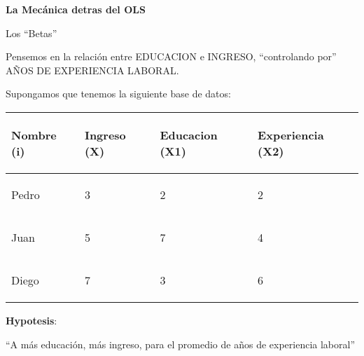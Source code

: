 \documentclass[10pt]{article}
\begin{document}
\begin{center}
\textbf{La Mec\'anica detras del OLS}

Los ``Betas''



Pensemos en la relaci\'on entre EDUCACION e INGRESO, ``controlando por'' A\~NOS DE EXPERIENCIA LABORAL.



Supongamos que tenemos la siguiente base de datos:


\begin{table}[!h]
        \centering
        
\begin{tabular}{|p{}|p{}|p{}|p{}|}
\hline 
 \begin{center}
\textbf{Nombre (i)}
\end{center}
 & \begin{center}
\textbf{Ingreso (X)}
\end{center}
 & \begin{center}
\textbf{Educacion (X1)}
\end{center}
 & \begin{center}
\textbf{Experiencia (X2)}
\end{center}
 \\
\hline 
 \begin{center}
Pedro
\end{center}
 & \begin{center}
3
\end{center}
 & \begin{center}
2
\end{center}
 & \begin{center}
2
\end{center}
 \\
\hline 
 \begin{center}
Juan
\end{center}
 & \begin{center}
5
\end{center}
 & \begin{center}
7
\end{center}
 & \begin{center}
4
\end{center}
 \\
\hline 
 \begin{center}
Diego
\end{center}
 & \begin{center}
7
\end{center}
 & \begin{center}
3
\end{center}
 & \begin{center}
6
\end{center}
 \\
 \hline
\end{tabular}
        
        \end{table}


\textbf{Hypotesis}:

``A m\'as educaci\'on, m\'as ingreso, para el promedio de a\~nos de experiencia laboral''

\end{center}
\end{document}
